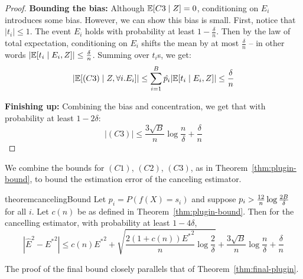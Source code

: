 \begin{proof}
\textbf{Bounding the bias:} Although $\mathbb{E}[C3 \mid Z] = 0$, conditioning on $E_i$ introduces some bias.
However, we can show this bias is small. First, notice that $|t_i| \leq 1$. The event $E_i$ holds with probability at least $1 - \frac{\delta}{n}$. Then by the law of total expectation, conditioning on $E_i$ shifts the mean by at most $\frac{\delta}{n}$ -- in other words $|\mathbb{E}[t_i \mid E_i, Z]| \leq \frac{\delta}{n}$.
Summing over $t_i$s, we get:
\[ \lvert \mathbb{E}[(C3) \mid Z, \forall i. E_i] \rvert \leq \sum_{i=1}^B \hat{p_i} \lvert \mathbb{E}[t_i \mid E_i, Z] \rvert \leq \frac{\delta}{n} \]

\textbf{Finishing up:} Combining the bias and concentration, we get that with probability at least $1 - 2\delta$:
\[ |(C3)| \leq \frac{3\sqrt{B}}{n} \log{\frac{n}{\delta}} + \frac{\delta}{n}\]

\end{proof}

We combine the bounds for $(C1)$, $(C2)$, $(C3)$, as in Theorem~\ref{thm:plugin-bound}, to bound the estimation error of the canceling estimator.

\begin{restatable}{theorem}{cancelingBound}
\label{thm:our-bound}
Let $p_i = P(f(X) = s_i)$ and suppose $p_i > \frac{12}{n}\log{\frac{2B}{\delta}}{}$ for all $i$. Let $c(n)$ be as defined in Theorem~\ref{thm:plugin-bound}. 
Then for the cancelling estimator, with probability at least $1 - 4\delta$,
\[ | \hat{E}^2 - {E^*}^2 | \leq c(n){E^*}^2 + \sqrt{\frac{2(1+c(n)){E^*}^2}{n} \log{\frac{2}{\delta}}} + \frac{3\sqrt{B}}{n} \log{\frac{n}{\delta}} + \frac{\delta}{n}\]
\end{restatable}

The proof of the final bound closely parallels that of Theorem~\ref{thm:final-plugin}.

\finalCanceling*
